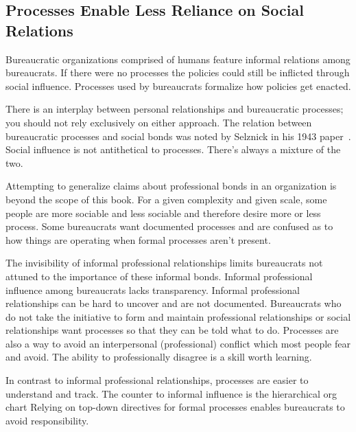 \subsection*{Processes Enable Less Reliance on Social Relations}

Bureaucratic organizations comprised of humans feature informal relations among bureaucrats. If there were no processes the policies could still be inflicted through social influence. Processes used by bureaucrats formalize how policies get enacted. 

There is an interplay between personal relationships and bureaucratic processes; you should not rely exclusively on either approach. The relation between bureaucratic processes and social bonds was noted by Selznick in his 1943 paper~\cite{1943_Selznick}. 
Social influence is not antithetical to processes. There's always a mixture of the two.

Attempting to generalize claims about professional bonds in an organization is beyond the scope of this book. 
For a given complexity and given scale, some people are more sociable and less sociable and therefore desire more or less process.
Some bureaucrats want documented processes and are confused as to how things are operating when formal processes aren't present. 

The invisibility of informal professional relationships limits bureaucrats not attuned to the importance of these informal bonds. 
Informal professional influence among bureaucrats lacks transparency. Informal professional relationships can be hard to uncover and are not documented. 
Bureaucrats who do not take the initiative to form and maintain professional relationships or social relationships want processes so that they can be told what to do. Processes are also a way to avoid an interpersonal (professional) conflict which most people fear and avoid. The ability to professionally disagree is a skill worth learning.

In contrast to informal professional relationships, processes are easier to understand and track. The counter to informal influence is the hierarchical 
\gls{org chart}%
\iftoggle{haspagenumbers}{ described on page~\pageref{sec:org-chart-as-guide-and-lie}.}{.}
Relying on top-down directives for formal processes enables bureaucrats to avoid responsibility.

